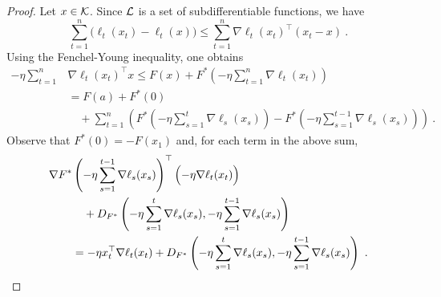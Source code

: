 %
\begin{proof}
Let $x \in \mathcal{K}$. Since $\mathcal{L}$ is a set of subdifferentiable functions, we have
$$\sum_{t=1}^n \bigl( \ell_t(x_t) - \ell_t(x) \bigr) \leq \sum_{t=1}^n \nabla \ell_t(x_t)^{\top} (x_t -x)~.$$ Using the Fenchel-Young inequality, one obtains
\begin{align*}
- \eta \sum_{t=1}^n &\nabla \ell_t(x_t)^{\top} x
\leq
    F(x) + F^*\left( - \eta \sum_{t=1}^{n} \nabla \ell_t(x_t) \right)
\\&=
    F(a) + F^*(0) \\ & \quad + \sum_{t=1}^n \left( F^*\left( - \eta \sum_{s=1}^{t} \nabla \ell_s(x_s)\right)  - F^*\left( - \eta \sum_{s=1}^{t-1} \nabla \ell_s(x_s)\right) \right)~.
\end{align*}
Observe that $F^*(0)= - F(x_1)$ and, for each term in the above sum,
\begin{align*}
    \nabla F^*&\left( - \eta \sum_{s=1}^{t-1} \nabla \ell_s(x_s) \right)^{\top} \Bigl(- \eta \nabla \ell_t(x_t)\Bigr)
\\& \quad
    + D_{F^*}\left(- \eta \sum_{s=1}^{t} \nabla \ell_s(x_s), - \eta \sum_{s=1}^{t-1} \nabla \ell_s(x_s)\right)
\\ &=
    - \eta x_t^{\top} \nabla \ell_t(x_t) + D_{F^*}\left(- \eta \sum_{s=1}^{t} \nabla \ell_s(x_s), - \eta \sum_{s=1}^{t-1} \nabla \ell_s(x_s) \right)~.
\end{align*}
\end{proof}

